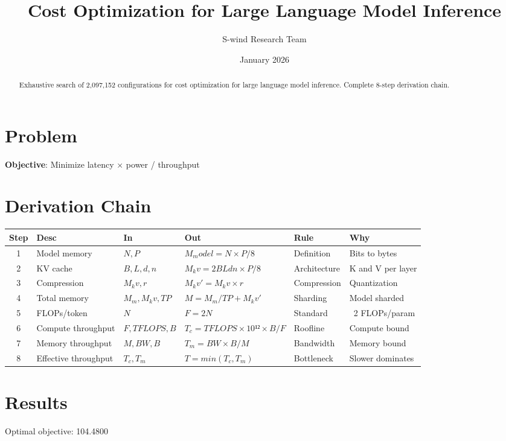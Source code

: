\documentclass[11pt]{article}
\title{Cost Optimization for Large Language Model Inference}
\author{S-wind Research Team}
\date{January 2026}
\begin{document}
\maketitle

\begin{abstract}
Exhaustive search of 2,097,152 configurations for cost optimization for large language model inference. Complete 8-step derivation chain.
\end{abstract}

\section{Problem}
\textbf{Objective}: Minimize latency × power / throughput

\section{Derivation Chain}
\begin{longtable}{|c|p{2cm}|p{2cm}|p{3cm}|p{2cm}|p{3cm}|}
\hline
Step & Desc & In & Out & Rule & Why\\\hline\endhead
1 & Model memory & $N, P$ & $M_model = N×P/8$ & Definition & Bits to bytes\\\hline
2 & KV cache & $B, L, d, n$ & $M_kv = 2BLdn×P/8$ & Architecture & K and V per layer\\\hline
3 & Compression & $M_kv, r$ & $M_kv' = M_kv×r$ & Compression & Quantization\\\hline
4 & Total memory & $M_m, M_kv, TP$ & $M = M_m/TP + M_kv'$ & Sharding & Model sharded\\\hline
5 & FLOPs/token & $N$ & $F = 2N$ & Standard & ~2 FLOPs/param\\\hline
6 & Compute throughput & $F, TFLOPS, B$ & $T_c = TFLOPS×10¹²×B/F$ & Roofline & Compute bound\\\hline
7 & Memory throughput & $M, BW, B$ & $T_m = BW×B/M$ & Bandwidth & Memory bound\\\hline
8 & Effective throughput & $T_c, T_m$ & $T = min(T_c, T_m)$ & Bottleneck & Slower dominates\\\hline
\end{longtable}

\section{Results}
Optimal objective: 104.4800
\end{document}
